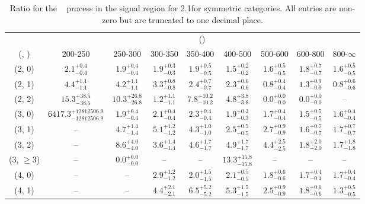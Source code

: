 \begin{table}[h!]
\tiny
\centering
\caption{Ratio for the \zInv~ process in the signal region for 2.1\ifb for symmetric categories. All entries are non-zero but are truncated to one decimal place.\label{tab:ratiosep_sig_zinv_sym}}
\begin{tabular}
{ccccccccc}
	\hline\hline
	& \multicolumn{8}{c}{\scalht (\gev)} \\ 
	 (\njet,  \nb) & 200-250 & 250-300 & 300-350 & 350-400 & 400-500 & 500-600 & 600-800 & 800-$\infty$ \\ [0.8ex] 
\hline
	(2, 0) & $2.1^{+ 0.4 }_{- 0.4 }$ & $1.9^{+ 0.4 }_{- 0.4 }$ & $1.9^{+ 0.3 }_{- 0.3 }$ & $1.9^{+ 0.5 }_{- 0.5 }$ & $1.5^{+ 0.2 }_{- 0.2 }$ & $1.6^{+ 0.5 }_{- 0.5 }$ & $1.8^{+ 0.7 }_{- 0.7 }$ & $1.6^{+ 0.5 }_{- 0.5 }$ \\[0.5ex] 
	(2, 1) & $4.4^{+ 1.1 }_{- 1.1 }$ & $4.2^{+ 1.1 }_{- 1.1 }$ & $3.3^{+ 0.8 }_{- 0.8 }$ & $2.4^{+ 0.7 }_{- 0.7 }$ & $2.3^{+ 0.6 }_{- 0.6 }$ & $0.8^{+ 0.4 }_{- 0.4 }$ & $1.3^{+ 0.9 }_{- 0.9 }$ & $0.8^{+ 0.6 }_{- 0.6 }$ \\[0.5ex] 
	(2, 2) & $15.3^{+ 38.5 }_{- 38.5 }$ & $10.3^{+ 26.8 }_{- 26.8 }$ & $1.2^{+ 1.1 }_{- 1.1 }$ & $7.8^{+ 10.2 }_{- 10.2 }$ & $4.8^{+ 3.8 }_{- 3.8 }$ & $0.0^{+ 0.0 }_{- 0.0 }$ & $0.0^{+ 0.0 }_{- 0.0 }$ & -- \\[0.5ex] 
	(3, 0) & $6417.3^{+ 12812506.9 }_{- 12812506.9 }$ & $1.9^{+ 0.4 }_{- 0.4 }$ & $2.1^{+ 0.4 }_{- 0.4 }$ & $2.3^{+ 0.4 }_{- 0.4 }$ & $1.9^{+ 0.3 }_{- 0.3 }$ & $1.7^{+ 0.4 }_{- 0.4 }$ & $1.5^{+ 0.5 }_{- 0.5 }$ & $1.6^{+ 0.4 }_{- 0.4 }$ \\[0.5ex] 
	(3, 1) & -- & $4.7^{+ 1.4 }_{- 1.4 }$ & $5.1^{+ 1.2 }_{- 1.2 }$ & $4.3^{+ 1.0 }_{- 1.0 }$ & $2.5^{+ 0.5 }_{- 0.5 }$ & $2.7^{+ 0.9 }_{- 0.9 }$ & $1.6^{+ 0.7 }_{- 0.7 }$ & $1.7^{+ 0.7 }_{- 0.7 }$ \\[0.5ex] 
	(3, 2) & -- & $8.6^{+ 4.0 }_{- 4.0 }$ & $3.6^{+ 1.4 }_{- 1.4 }$ & $4.6^{+ 1.7 }_{- 1.7 }$ & $4.9^{+ 1.7 }_{- 1.7 }$ & $4.4^{+ 2.5 }_{- 2.5 }$ & $1.8^{+ 2.0 }_{- 2.0 }$ & $1.7^{+ 1.8 }_{- 1.8 }$ \\[0.5ex] 
	(3, $\ge3$) & -- & $0.0^{+ 0.0 }_{- 0.0 }$ & -- & -- & $13.3^{+ 15.8 }_{- 15.8 }$ & -- & -- & -- \\[0.5ex] 
	(4, 0) & -- & -- & $2.9^{+ 1.2 }_{- 1.2 }$ & $2.0^{+ 1.5 }_{- 1.5 }$ & $2.1^{+ 0.5 }_{- 0.5 }$ & $1.8^{+ 0.6 }_{- 0.6 }$ & $1.7^{+ 0.4 }_{- 0.4 }$ & $1.7^{+ 0.4 }_{- 0.4 }$ \\[0.5ex] 
	(4, 1) & -- & -- & $4.4^{+ 2.1 }_{- 2.1 }$ & $6.5^{+ 5.2 }_{- 5.2 }$ & $5.3^{+ 1.5 }_{- 1.5 }$ & $2.5^{+ 0.9 }_{- 0.9 }$ & $1.8^{+ 0.6 }_{- 0.6 }$ & $1.3^{+ 0.5 }_{- 0.5 }$ \\[0.5ex] 

\end{tabular}
\end{table}
